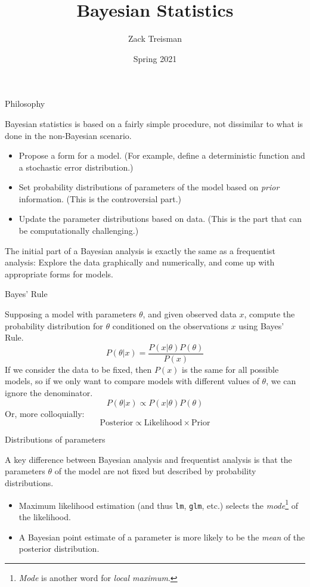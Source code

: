 \documentclass[
  ignorenonframetext,
]{beamer}
\title{Bayesian Statistics}
\author{Zack Treisman}
\date{Spring 2021}
\providecommand{\tightlist}{%
  \setlength{\itemsep}{0pt}\setlength{\parskip}{0pt}}
\begin{document}
\frame{\titlepage}

\begin{frame}{Philosophy}
\protect\hypertarget{philosophy}{}

Bayesian statistics is based on a fairly simple procedure, not
dissimilar to what is done in the non-Bayesian scenario.

\begin{itemize}
\tightlist
\item
  Propose a form for a model. (For example, define a deterministic
  function and a stochastic error distribution.)
\item
  Set probability distributions of parameters of the model based on
  \emph{prior} information. (This is the controversial part.)
\item
  Update the parameter distributions based on data. (This is the part
  that can be computationally challenging.)
\end{itemize}

The initial part of a Bayesian analysis is exactly the same as a
frequentist analysis: Explore the data graphically and numerically, and
come up with appropriate forms for models.

\end{frame}

\begin{frame}{Bayes' Rule}
\protect\hypertarget{bayes-rule}{}

Supposing a model with parameters \(\theta\), and given observed data
\(x\), compute the probability distribution for \(\theta\) conditioned
on the observations \(x\) using Bayes' Rule. \[
P(\theta|x)=\frac{P(x|\theta)P(\theta)}{P(x)}
\] If we consider the data to be fixed, then \(P(x)\) is the same for
all possible models, so if we only want to compare models with different
values of \(\theta\), we can ignore the denominator. \[
P(\theta|x)\propto P(x|\theta)P(\theta)
\] Or, more colloquially: \[
\text{Posterior} \propto \text{Likelihood} \times \text{Prior}
\]

\end{frame}

\begin{frame}[fragile]{Distributions of parameters}
\protect\hypertarget{distributions-of-parameters}{}

A key difference between Bayesian analysis and frequentist analysis is
that the parameters \(\theta\) of the model are not fixed but described
by probability distributions.

\begin{itemize}
\tightlist
\item
  Maximum likelihood estimation (and thus \texttt{lm}, \texttt{glm},
  etc.) selects the
  \emph{mode}\footnote{\emph{Mode} is another word for \emph{local maximum}.}
  of the likelihood.
\item
  A Bayesian point estimate of a parameter is more likely to be the
  \emph{mean} of the posterior distribution.
\end{itemize}

\end{frame}
\end{document}
